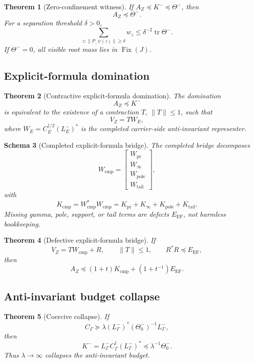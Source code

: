 \documentclass[11pt]{article}
\newtheorem{theorem}{Theorem}[section]
\newtheorem{schema}[theorem]{Schema}
\DeclareMathOperator{\tr}{tr}
\DeclareMathOperator{\Fix}{Fix}
\newcommand{\EF}{\mathrm{EF}}
\newcommand{\cmp}{\mathrm{cmp}}
\newcommand{\pr}{\mathrm{pr}}
\newcommand{\tail}{\mathrm{tail}}
\begin{document}
\begin{theorem}[Zero-confinement witness]
If \(A_Z\preceq K^-\preceq\Theta^-\), then
\[
  A_Z\preceq\Theta^-.
\]
For a separation threshold \(\delta>0\),
\[
  \sum_{z:\|P_-\psi(z)\|\ge\delta}w_z\le \delta^{-2}\tr\Theta^-.
\]
If \(\Theta^-=0\), all visible root mass lies in \(\Fix(J)\).
\end{theorem}

\subsection{Explicit-formula domination}
\begin{theorem}[Contractive explicit-formula domination]
The domination
\[
  A_Z\preceq K^-
\]
is equivalent to the existence of a contraction \(T\), \(\|T\|\le1\), such that
\[
  V_Z=TW_E,
\]
where \(W_E=C_E^{\dagger/2}(L_E^-)^*\) is the completed carrier-side anti-invariant representer.
\end{theorem}

\begin{schema}[Completed explicit-formula bridge]
The completed bridge decomposes
\[
  W_\cmp=\begin{bmatrix}W_\pr\\W_\infty\\W_\mathrm{pole}\\W_\tail\end{bmatrix},
\]
with
\[
  K_\cmp=W_\cmp^*W_\cmp=K_\pr+K_\infty+K_\mathrm{pole}+K_\tail.
\]
Missing gamma, pole, support, or tail terms are defects \(E_{\EF}\), not harmless bookkeeping.
\end{schema}

\begin{theorem}[Defective explicit-formula bridge]
If
\[
  V_Z=TW_\cmp+R,
  \qquad \|T\|\le1,
  \qquad R^*R\preceq E_{\EF},
\]
then
\[
  A_Z\preceq(1+t)K_\cmp+(1+t^{-1})E_{\EF}.
\]
\end{theorem}

\subsection{Anti-invariant budget collapse}
\begin{theorem}[Coercive collapse]
If
\[
  C_\Gamma\succeq \lambda (L^-_\Gamma)^*(\Theta_0^-)^{-1}L^-_\Gamma,
\]
then
\[
  K^-=L^-_\Gamma C_\Gamma^\dagger(L^-_\Gamma)^*\preceq\lambda^{-1}\Theta_0^-.
\]
Thus \(\lambda\to\infty\) collapses the anti-invariant budget.
\end{theorem}
\end{document}
